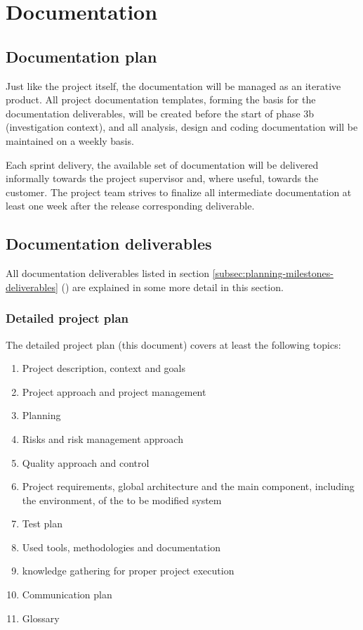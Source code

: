 
\section{Documentation}
\label{sec:documentation}
\subsection{Documentation plan}
Just like the project itself, the documentation will be managed as an iterative product.
All project documentation templates, forming the basis for the documentation deliverables, will be created before the start of phase 3b (investigation context), and all analysis, design and coding documentation will be maintained on a weekly basis.

Each sprint delivery, the available set of documentation will be delivered informally towards the project supervisor and, where useful, towards the customer.
The project team strives to finalize all intermediate documentation at least one week after the release corresponding deliverable.

\subsection{Documentation deliverables}
All documentation deliverables listed in section \ref{subsec:planning-milestones-deliverables} () are explained in some more detail in this section.

\subsubsection{Detailed project plan}
The detailed project plan (this document) covers at least the following topics:

	\begin{enumerate}
		\item Project description, context and goals
		\item Project approach and project management
		\item Planning
		\item Risks and risk management approach
		\item Quality approach and control
		\item Project requirements, global architecture and the main component, including the environment, of the to be modified system
		\item Test plan
		\item Used tools, methodologies and documentation
		\item knowledge gathering for proper project execution
		\item Communication plan
		\item Glossary
	\end {enumerate}

